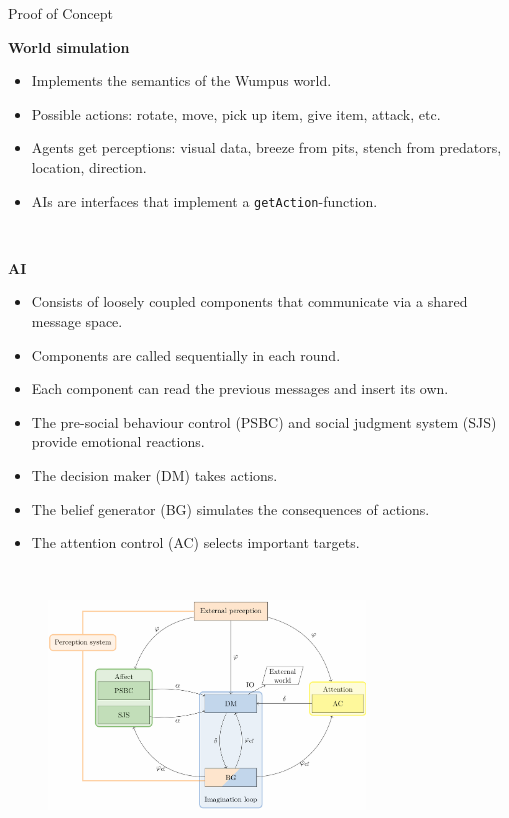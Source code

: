 \documentclass[final,hyperref={pdfpagelabels=false}]{beamer}
\begin{document}
\begin{frame}
\begin{columns}[t]
\begin{column}{.45\textwidth}
\begin{block}{Proof of Concept}
                $~$
                
                \textbf{World simulation}
                \begin{itemize}
                    \item Implements the semantics of the Wumpus world.
                    \item Possible actions: rotate, move, pick up item, give item, attack, etc.
                    \item Agents get perceptions: visual data, breeze from pits, stench from predators, location, direction.
                    \item AIs are interfaces that implement a \texttt{getAction}-function.
                \end{itemize}
                
                $~$
                
                \textbf{AI}
                \begin{itemize}
                    \item Consists of loosely coupled components that communicate via a shared message space.
                    \item Components are called sequentially in each round.
                    \item Each component can read the previous messages and insert its own.
                    \item The pre-social behaviour control (PSBC) and social judgment system (SJS) provide emotional reactions.
                    \item The decision maker (DM) takes actions.
                    \item The belief generator (BG) simulates the consequences of actions.
                    \item The attention control (AC) selects important targets.
                \end{itemize}
                
                $~$
                
                \begin{figure}
                	\centering
                	\includegraphics[width=0.75\textwidth]{figures/architecture.png}
                \end{figure}
            \end{block}
            

\end{column}
\end{columns}
\end{frame}
\end{document}
